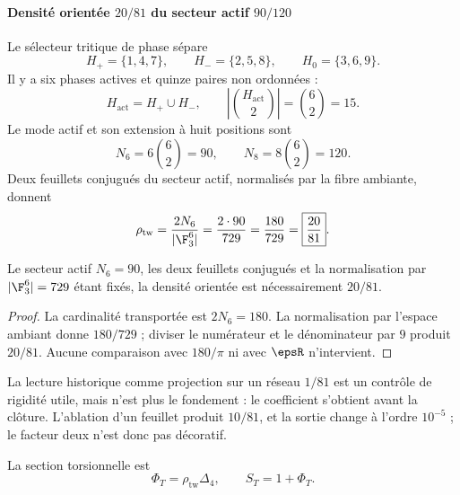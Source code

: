 
\paragraph{Densité orientée \(20/81\) du secteur actif \(90/120\)}

Le sélecteur tritique de phase sépare
\[
H_+=\{1,4,7\},\qquad H_-=\{2,5,8\},\qquad H_0=\{3,6,9\}.
\]
Il y a six phases actives et quinze paires non ordonnées :
\[
H_{\mathrm{act}}=H_+\cup H_-,\qquad
\left|\binom{H_{\mathrm{act}}}2\right|=\binom62=15.
\]
Le mode actif et son extension à huit positions sont
\begin{equation}
N_6=6\binom62=90,\qquad
N_8=8\binom62=120.
\label{eq:90-120-incidencia}
\end{equation}
Deux feuillets conjugués du secteur actif, normalisés par la fibre ambiante,
donnent
\begin{equation}
\rho_{\mathrm{tw}}
=\frac{2N_6}{|\F_3^6|}
=\frac{2\cdot90}{729}
=\frac{180}{729}
=\boxed{\frac{20}{81}}.
\label{eq:rho-twoway}
\end{equation}

\begin{proposition}
Le secteur actif \(N_6=90\), les deux feuillets conjugués et la
normalisation par \(|\F_3^6|=729\) étant fixés, la densité orientée est nécessairement
\(20/81\).
\end{proposition}
\begin{proof}
La cardinalité transportée est \(2N_6=180\). La normalisation par l'espace ambiant
donne \(180/729\) ; diviser le numérateur et le dénominateur par \(9\) produit \(20/81\).
Aucune comparaison avec \(180/\pi\) ni avec \(\epsR\) n'intervient.
\end{proof}

La lecture historique comme projection sur un réseau \(1/81\) est un contrôle de
rigidité utile, mais n'est plus le fondement : le coefficient s'obtient avant
la clôture. L'ablation d'un feuillet produit \(10/81\), et la sortie change à
l'ordre \(10^{-5}\) ; le facteur deux n'est donc pas décoratif.

La section torsionnelle est
\begin{equation}
\Phi_T=\rho_{\mathrm{tw}}\Delta_4,
\qquad
S_T=1+\Phi_T.
\label{eq:seccion-torsional}
\end{equation}

